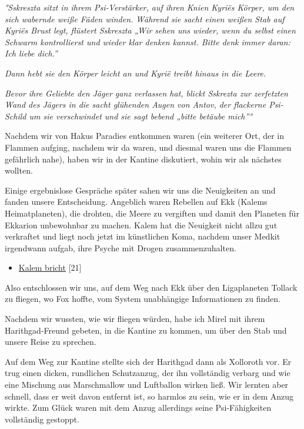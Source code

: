 \documentclass[11pt]{scrartcl}
\begin{document}
\emph{°Sskreszta sitzt in ihrem Psi-Verstärker, auf ihren Knien Kyriës
Körper, um den sich wabernde weiße Fäden winden. Während sie sacht einen
weißen Stab auf Kyriës Brust legt, flüstert Sskreszta „Wir sehen uns
wieder, wenn du selbst einen Schwarm kontrollierst und wieder klar
denken kannst. Bitte denk immer daran: Ich liebe dich.''}

\emph{Dann hebt sie den Körper leicht an und Kyrië treibt hinaus in die
Leere.}

\emph{Bevor ihre Geliebte den Jäger ganz verlassen hat, blickt Sskrezta
zur zerfetzten Wand des Jägers in die sacht glühenden Augen von Antov,
der flackerne Psi-Schild um sie verschwindet und sie sagt bebend „bitte
betäube mich''°}

Nachdem wir von Hakus Paradies entkommen waren (ein weiterer Ort, der in
Flammen aufging, nachdem wir da waren, und diesmal waren uns die Flammen
gefährlich nahe), haben wir in der Kantine diskutiert, wohin wir als
nächstes wollten.

Einige ergebnislose Gespräche später sahen wir uns die Neuigkeiten an
und fanden unsere Entscheidung. Angeblich waren Rebellen auf Ekk (Kalems
Heimatplaneten), die drohten, die Meere zu vergiften und damit den
Planeten für Ekkarion unbewohnbar zu machen. Kalem hat die Neuigkeit
nicht allzu gut verkraftet und liegt noch jetzt im künstlichen Koma,
nachdem unser Medkit irgendwann aufgab, ihre Psyche mit Drogen
zusammenzuhalten.

\begin{itemize}
\item
  \href{http://1w6.org/deutsch/kampagnen/waechter-der-zeit/aufzeichnungen/sskreszta-log/ekk-in-gefahr}{Kalem
  bricht} {[}21{]}
\end{itemize}
Also entschlossen wir uns, auf dem Weg nach Ekk über den Ligaplaneten
Tollack zu fliegen, wo Fox hoffte, vom System unabhängige Informationen
zu finden.

Nachdem wir wussten, wie wir fliegen würden, habe ich Mirel mit ihrem
Harithgad-Freund gebeten, in die Kantine zu kommen, um über den Stab und
unsere Reise zu sprechen.

Auf dem Weg zur Kantine stellte sich der Harithgad dann als Xolloroth
vor. Er trug einen dicken, rundlichen Schutzanzug, der ihn vollständig
verbarg und wie eine Mischung aus Marschmallow und Luftballon wirken
ließ. Wir lernten aber schnell, dass er weit davon entfernt ist, so
harmlos zu sein, wie er in dem Anzug wirkte. Zum Glück waren mit dem
Anzug allerdings seine Psi-Fähigkeiten vollständig gestoppt.
\end{document}
